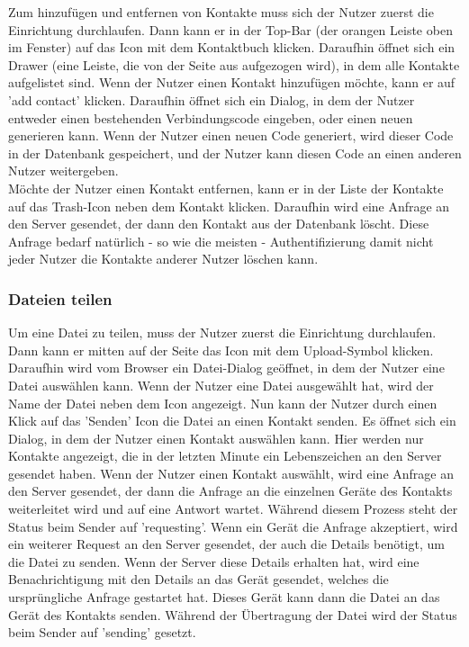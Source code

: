 \documentclass[a4paper]{article}
\begin{document}
Zum hinzufügen und entfernen von Kontakte muss sich der Nutzer zuerst die
Einrichtung durchlaufen. Dann kann er in der Top-Bar (der orangen Leiste oben im
Fenster) auf das Icon mit dem Kontaktbuch klicken. Daraufhin öffnet sich ein
Drawer (eine Leiste, die von der Seite aus aufgezogen wird), in dem alle
Kontakte aufgelistet sind. Wenn der Nutzer einen Kontakt hinzufügen möchte, kann
er auf 'add contact' klicken. Daraufhin öffnet sich ein Dialog, in dem der
Nutzer entweder einen bestehenden Verbindungscode eingeben, oder einen neuen
generieren kann. Wenn der Nutzer einen neuen Code generiert, wird dieser Code in
der Datenbank gespeichert, und der Nutzer kann diesen Code an einen anderen
Nutzer weitergeben.\\
Möchte der Nutzer einen Kontakt entfernen, kann er in der Liste der Kontakte auf
das Trash-Icon neben dem Kontakt klicken. Daraufhin wird eine Anfrage an den
Server gesendet, der dann den Kontakt aus der Datenbank löscht. Diese Anfrage
bedarf natürlich - so wie die meisten - Authentifizierung damit nicht jeder
Nutzer die Kontakte anderer Nutzer löschen kann.



\subsubsection{Dateien teilen}

Um eine Datei zu teilen, muss der Nutzer zuerst die Einrichtung durchlaufen.
Dann kann er mitten auf der Seite das Icon mit dem Upload-Symbol klicken.
Daraufhin wird vom Browser ein Datei-Dialog geöffnet, in dem der Nutzer eine
Datei auswählen kann. Wenn der Nutzer eine Datei ausgewählt hat, wird der Name
der Datei neben dem Icon angezeigt. Nun kann der Nutzer durch einen Klick auf
das 'Senden' Icon die Datei an einen Kontakt senden. Es öffnet sich ein Dialog,
in dem der Nutzer einen Kontakt auswählen kann. Hier werden nur Kontakte
angezeigt, die in der letzten Minute ein Lebenszeichen an den Server gesendet
haben. Wenn der Nutzer einen Kontakt auswählt, wird eine Anfrage an den Server
gesendet, der dann die Anfrage an die einzelnen Geräte des Kontakts weiterleitet wird
und auf eine Antwort wartet. Während diesem Prozess steht der Status beim Sender auf 'requesting'.
Wenn ein Gerät die Anfrage akzeptiert, wird ein weiterer Request an den Server gesendet, der
auch die Details benötigt, um die Datei zu senden. Wenn der Server diese
Details erhalten hat, wird eine Benachrichtigung mit den Details an das Gerät gesendet, welches
die ursprüngliche Anfrage gestartet hat. Dieses Gerät kann dann die Datei an
das Gerät des Kontakts senden. Während der Übertragung der Datei wird der
Status beim Sender auf 'sending' gesetzt.
\end{document}
